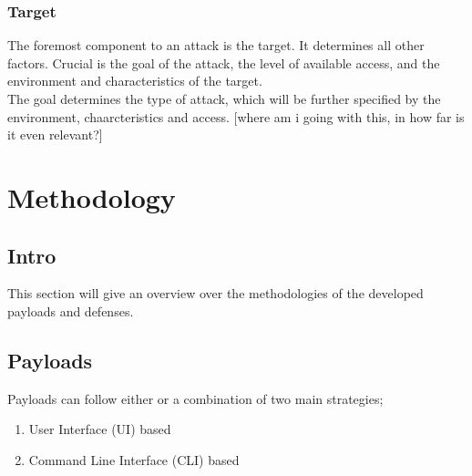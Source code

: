 \subsubsection{Target}

The foremost component to an attack is the target. It determines all other factors. Crucial is the goal of the attack, the level of available access, and the environment and characteristics of the target.\\
The goal determines the type of attack, which will be further specified by the environment, chaarcteristics and access. [where am i going with this, in how far is it even relevant?] 


\section{Methodology} \label{methodology}

\subsection{Intro}

This section will give an overview over the methodologies of the developed payloads and defenses.


\subsection{Payloads}

Payloads can follow either or a combination of two main strategies; 
\begin{enumerate}
    \item User Interface (UI) based
    \item Command Line Interface (CLI) based
\end{enumerate}

